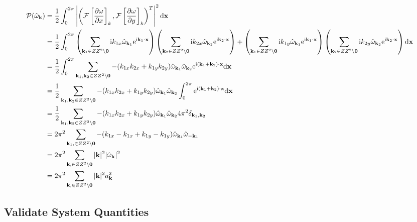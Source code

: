 \documentclass[9pt]{article}
\newcommand{\pder}[2]{\frac{\partial #1}{\partial #2}}               %
\newcommand{\ii}{\mathrm{i}}      								  %
\newcommand{\e}{\mathrm{e}}      								  %
\newcommand{\omegahat}[1]{\hat{\omega}_{ \mathbf{#1} } }								%
\newcommand{\bfx}{\mathbf{x}}								%
\newcommand{\bfk}{\mathbf{k}}								%
\newcommand{\bfkn}[1]{\mathbf{k}_{#1}}								%
\begin{document}
\begin{align}
\mathcal{P}(\omegahat{k}) &= \frac{1}{2}\int_0^{2\pi} \left|\left(\mathcal{F}\left[\pder{\omega}{x}\right]_k, \mathcal{F}\left[\pder{\omega}{y}\right]_k \right)^{T} \right|^2\mathrm{d}\bfx \notag \\
&=  \frac{1}{2}\int_0^{2\pi} \left(\sum_{\mathbf{k}_1\in \mathbb{Z}^2\setminus \mathbf{0}}\ii k_{1x}\hat{\omega}_{\mathbf{k}_1}\e^{\ii \mathbf{k}_1\cdot \mathbf{x}}\right)\left(\sum_{\mathbf{k}_2\in \mathbb{Z}^2\setminus \mathbf{0}}\ii k_{2x}\hat{\omega}_{\mathbf{k}_2}\e^{\ii \mathbf{k}_2\cdot \mathbf{x}}\right) + \left(\sum_{\mathbf{k}_1\in \mathbb{Z}^2\setminus \mathbf{0}}\ii k_{1y}\hat{\omega}_{\mathbf{k}_1}\e^{\ii \mathbf{k}_1\cdot \mathbf{x}}\right)\left(\sum_{\mathbf{k}_2\in \mathbb{Z}^2\setminus \mathbf{0}}\ii k_{2y}\hat{\omega}_{\mathbf{k}_2}\e^{\ii \mathbf{k}_2\cdot \mathbf{x}}\right) \mathrm{d}\bfx \notag\\
&= \frac{1}{2}\int_0^{2\pi} \sum_{\mathbf{k}_1, \mathbf{k}_2\in \mathbb{Z}^2\setminus \mathbf{0}} -(k_{1x}k_{2x} + k_{1y}k_{2y})\hat{\omega}_{\bfkn{1}}\hat{\omega}_{\bfkn{2}}\e^{\ii (\bfkn{1} + \bfkn{2}) \cdot \bfx}\mathrm{d}\bfx \notag\\
&=  \frac{1}{2}\sum_{\mathbf{k}_1, \mathbf{k}_2\in \mathbb{Z}^2\setminus \mathbf{0}} -(k_{1x}k_{2x} + k_{1y}k_{2y})\hat{\omega}_{\bfkn{1}}\hat{\omega}_{\bfkn{2}}\int_0^{2\pi}\e^{\ii (\bfkn{1} + \bfkn{2}) \cdot \bfx}\mathrm{d}\bfx \notag\\
&=  \frac{1}{2}\sum_{\mathbf{k}_1, \mathbf{k}_2\in \mathbb{Z}^2\setminus \mathbf{0}} -(k_{1x}k_{2x} + k_{1y}k_{2y})\hat{\omega}_{\bfkn{1}}\hat{\omega}_{\bfkn{2}} 4\pi^2 \delta_{\bfkn{1}, \bfkn{2}} \notag\\
&=  2\pi^2 \sum_{\mathbf{k}_1, \in \mathbb{Z}^2\setminus \mathbf{0}} -(k_{1x}-k_{1x} + k_{1y}-k_{1y})\hat{\omega}_{\bfkn{1}}\hat{\omega}_{-\bfkn{1}} \notag\\
&=  2\pi^2 \sum_{\mathbf{k}, \in \mathbb{Z}^2\setminus \mathbf{0}} |\bfk|^2 |\hat{\omega}_{\bfk}|^2 \notag\\
&=  2\pi^2 \sum_{\mathbf{k}, \in \mathbb{Z}^2\setminus \mathbf{0}} |\bfk|^2 a_{\bfk}^2 \notag\\
\label{eq:palinstrophy_fourier}
\end{align}


\subsection{Validate System Quantities}
\end{document}
